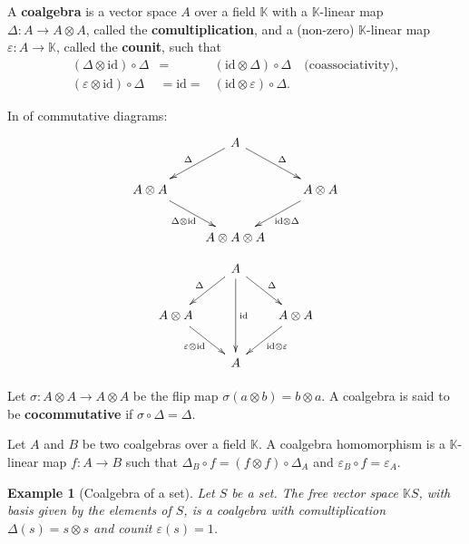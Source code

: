 \documentclass[12pt]{article}
\newcommand*{\Kset}{\mathbb{K}}
\newcommand*{\id}{\mathrm{id}}
\theoremstyle{inlinedefn}
\theoremstyle{break}
\newtheorem{example}{Example}
\begin{document}
A \textbf{coalgebra} is a vector space $A$ over a field $\Kset$ with a $\Kset$-linear map $\Delta\colon A \to A\otimes A$,
called the \textbf{comultiplication},
and a (non-zero) $\Kset$-linear map $\varepsilon\colon A \to \Kset$,
called the \textbf{counit}, such that
\begin{eqnarray*}
(\Delta\otimes\id)\circ\Delta & = & (\id\otimes\Delta)\circ\Delta \quad\mbox{(coassociativity)}, \\
(\varepsilon\otimes\id)\circ\Delta & = \id = & (\id\otimes\varepsilon)\circ\Delta.
\end{eqnarray*}

In  of commutative diagrams:
\[\begin{xy}
\xymatrix@R=20pt@C=20pt{
& *+<10pt>\txt{$A$} \ar_{\Delta}[dl] \ar^{\Delta}[dr] & \\
*+<10pt>\txt{$A\otimes A$} \ar_{\Delta\otimes\id}[dr] & & *+<10pt>\txt{$A\otimes A$} \ar^{\id\otimes\Delta}[dl] \\
& *+<10pt>\txt{$A\otimes A\otimes A$} &
}\end{xy}\]
\[\begin{xy}
\xymatrix@R=20pt@C=20pt{
& *+<10pt>\txt{$A$} \ar_{\Delta}[dl] \ar^{\id}[dd] \ar^{\Delta}[dr] & \\
*+<10pt>\txt{$A\otimes A$} \ar_{\varepsilon\otimes\id}[dr] & & *+<10pt>\txt{$A\otimes A$} \ar^{\id\otimes\varepsilon}[dl] \\
& *+<10pt>\txt{$A$} &
}\end{xy}\]

Let $\sigma\colon A\otimes A \to A\otimes A$ be the flip map $\sigma(a\otimes b) = b\otimes a$.
A coalgebra is said to be \textbf{cocommutative} if $\sigma\circ\Delta = \Delta$.

Let $A$ and $B$ be two coalgebras over a field $\Kset$.
A coalgebra homomorphism is a $\Kset$-linear map $f\colon A \to B$
such that $\Delta_B\circ f = (f\otimes f)\circ\Delta_A$
and $\varepsilon_B\circ f = \varepsilon_A$.

\begin{example}[Coalgebra of a set]
Let $S$ be a set.
The free vector space $\Kset S$, with basis given by the elements of $S$, is a coalgebra with comultiplication $\Delta(s) = s \otimes s$
and counit $\varepsilon(s) = 1$.
\end{example}
\end{document}
